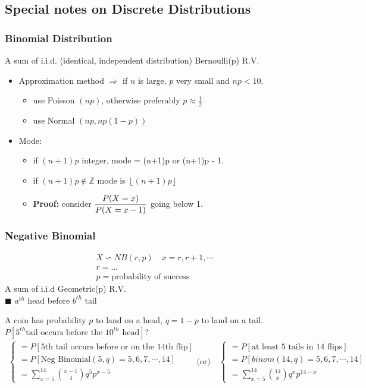 \subsection*{Special notes on Discrete Distributions}
\subsubsection*{Binomial Distribution}
A sum of i.i.d. (identical, independent distribution) Bernoulli(p) R.V.
\begin{itemize}
	\item Approximation method $\Rightarrow$ if $n$ is large, $p$ very small and $np < 10$.
	\begin{itemize}[label={--}]
		\item use Poisson $(np)$, otherwise preferably $p \approx \frac{1}{2}$
		\item use Normal $(np, np(1-p))$
	\end{itemize}
	\item Mode: 
	\begin{itemize}[label={--}]
		\item if $(n+1)p$ integer, mode = (n+1)p or (n+1)p - 1.
		\item if $(n+1)p \notin \mathbb{Z}$ mode is $\left \lfloor{(n+1)p}\right \rfloor$
		\item \textbf{Proof:} consider $\mathlarger{\frac{P(X=x)}{P(X=x-1)}}$ going below 1.
	\end{itemize}
\end{itemize}
\subsubsection*{Negative Binomial}
\begin{gather*}
	X \backsim NB(r,p) \quad x = r, r+1, \cdots \\
	r = \text{...}\\
	p = \text{probability of success}
\end{gather*}
A sum of i.i.d Geometric(p) R.V.\\
$\blacksquare$ $a^{th}$ head before $b^{th}$ tail
\begin{example}
	A coin has probability $p$ to land on a head, $q = 1-p$ to land on a tail.\\
	$P[5^{th} \text{tail occurs before the } 10^{th} \text{ head}]$?
	\begin{gather*}
	\begin{cases}
		= P[\text{5th tail occurs before or on the 14th flip}]\\
		= P[\text{Neg Binomial}(5,q) = 5,6,7,\cdots, 14]\\
		= \sum\limits_{x=5}^{14} \binom{x-1}{4} q^5 p^{x-5}
	\end{cases}	\text{(or)} \quad
	\begin{cases}
		= P[\text{at least 5 tails in 14 flips}]\\
		= P[binom(14,q) = 5,6,7,\cdots, 14]\\
		= \sum\limits_{x=5}^{14} \binom{14}{x} q^x p^{14-x}
	\end{cases}
	\end{gather*}
\end{example}

